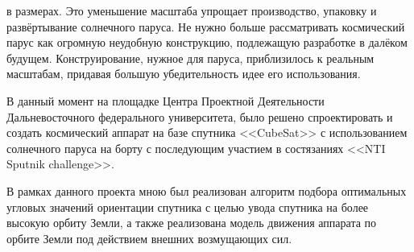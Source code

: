 в размерах. Это уменьшение масштаба упрощает производство, упаковку и
развёртывание солнечного паруса. Не нужно больше рассматривать космический
парус как огромную неудобную конструкцию, подлежащую разработке в далёком будущем.
Конструирование, нужное для паруса, приблизилось к реальным масштабам, придавая
большую убедительность идее его использования.\par
    В данный момент на площадке Центра Проектной Деятельности Дальневосточного
федерального университета, было решено спроектировать и создать космический аппарат
на базе спутника <<CubeSat>> с использованием солнечного паруса на борту
с последующим участием в состязаниях <<NTI Sputnik challenge>>.\par
    В рамках данного проекта мною был реализован алгоритм подбора оптимальных
угловых значений ориентации спутника с целью увода спутника на более высокую орбиту
Земли, а также реализована модель движения аппарата по орбите Земли под действием
внешних возмущающих сил.
